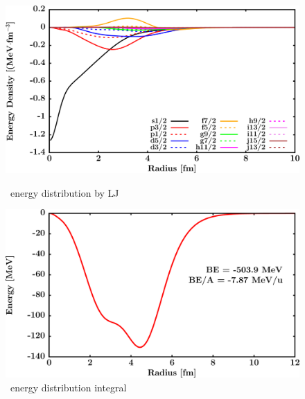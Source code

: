 \begin{figure}[hbtp]
    \centering
    \begin{minipage}{0.45\textwidth}
        \centering
        \includegraphics[width=\textwidth]{figures/ni64_EnergyDist.png}
        \caption*{\niFour\ energy distribution by LJ}
        \label{DOMFitData_ni64_proton_energyDistInt}
    \end{minipage}\hspace{6pt}
    \begin{minipage}{0.45\textwidth}
        \centering
        \includegraphics[width=\textwidth]{figures/ni64_EnergyDistIntegral.png}
        \caption*{\niFour\ energy distribution integral}
        \label{DOMFitData_ni64_neutron_energyDistInt}
    \end{minipage}
\end{figure}
\vspace{0.4in}
